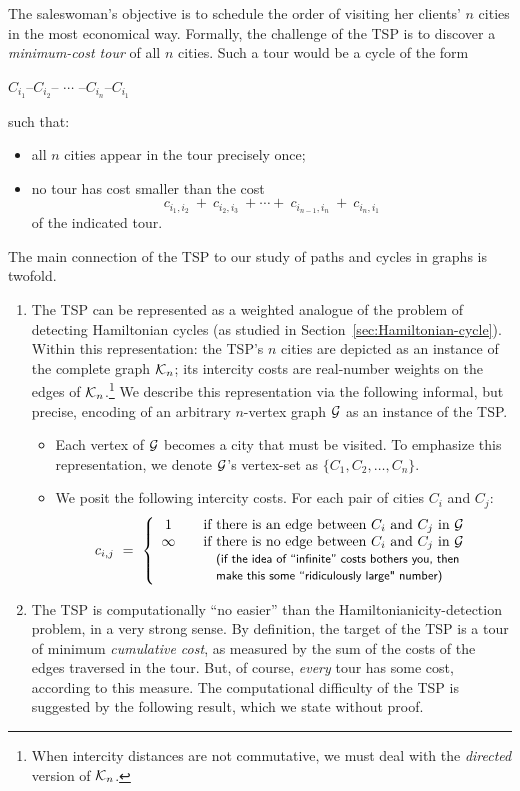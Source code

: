 The saleswoman's objective is to schedule the order of visiting her clients' $n$ cities in the most economical way.  Formally, the challenge of the TSP is to discover a {\em minimum-cost tour} of all $n$ cities.  Such a tour would be a cycle of the form

\hspace*{.35in} $C_{i_1}$--$C_{i_2}$-- $\cdots$ --$C_{i_n}$--$C_{i_1}$

\noindent such that:
\begin{itemize}
\item
all $n$ cities appear in the tour precisely once;
\item
no tour has cost smaller than the cost
\[ c_{i_1,i_2} \ + \ c_{i_2, i_3} \ + \cdots + \ c_{i_{n-1}, i_n} \ + \ c_{i_n, i_1}
\]
of the indicated tour.
\end{itemize}
The main connection of the TSP to our study of paths and cycles in graphs is twofold.
\begin{enumerate}
\item
The TSP can be represented as a weighted analogue of the problem of detecting Hamiltonian cycles (as studied in Section~\ref{sec:Hamiltonian-cycle}).  Within this representation: the TSP's $n$ cities are depicted as an instance of the complete graph $\mbox{$\cal K$}_n$; its intercity costs are real-number weights on the edges of $\mbox{$\cal K$}_n$.\footnote{When intercity distances are not commutative, we must deal with the {\em directed} version of $\mbox{$\cal K$}_n$.}  We describe this representation via the following informal, but precise, encoding of an arbitrary $n$-vertex graph $\mbox{$\cal G$}$ as an instance of the TSP.
  \begin{itemize}
  \item
Each vertex of $\mbox{$\cal G$}$ becomes a city that must be visited.  To emphasize this representation, we denote $\mbox{$\cal G$}$'s vertex-set as $\{C_1, C_2, \ldots, C_n\}$.
  \item
We posit the following intercity costs.  For each pair of cities $C_i$ and $C_j$:
\[ c_{i,j} \ = \ \left\{
\begin{array}{ccl}
1 & & \mbox{if there is an edge between $C_i$ and $C_j$ in $\g$} \\
\infty & & \mbox{if there is no edge between $C_i$ and $C_j$ in $\g$} \\
       & & \mbox{\small\sf (if the idea of ``infinite'' costs bothers you, then} \\
       & & \mbox{\small\sf make this some ``ridiculously large" number)}
\end{array}
\right.
\]
\end{itemize}

\item
The TSP is computationally ``no easier'' than the Hamiltonianicity-detection problem, in a very strong sense.  By definition, the target of the TSP is a tour of minimum {\em cumulative cost}, as measured by the sum of the costs of the edges traversed in the tour.  But, of course, {\em every} tour has some cost, according to this measure.  The computational difficulty of the TSP is suggested by the following result, which we state without proof.
\end{enumerate}

